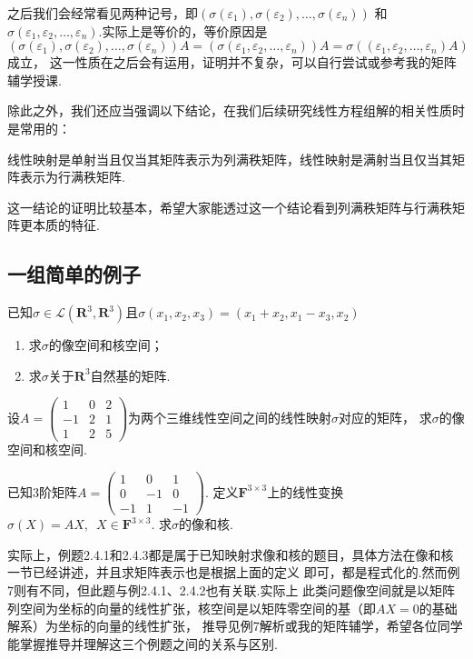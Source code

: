 之后我们会经常看见两种记号，即$(\sigma(\varepsilon_1),\sigma(\varepsilon_2),\ldots,\sigma(\varepsilon_n))$
和$\sigma(\varepsilon_1,\varepsilon_2,\ldots,\varepsilon_n)$.实际上是等价的，等价原因是
$(\sigma(\varepsilon_1),\sigma(\varepsilon_2),\ldots,\sigma(\varepsilon_n))A=(\sigma(\varepsilon_1,\varepsilon_2,\ldots,\varepsilon_n))A=\sigma((\varepsilon_1,\varepsilon_2,\ldots,\varepsilon_n)A)$成立，
这一性质在之后会有运用，证明并不复杂，可以自行尝试或参考我的矩阵辅学授课.

除此之外，我们还应当强调以下结论，在我们后续研究线性方程组解的相关性质时是常用的：
\begin{theorem}
    线性映射是单射当且仅当其矩阵表示为列满秩矩阵，线性映射是满射当且仅当其矩阵表示为行满秩矩阵.
\end{theorem}
这一结论的证明比较基本，希望大家能透过这一个结论看到列满秩矩阵与行满秩矩阵更本质的特征.
\subsection{一组简单的例子}
\begin{example}
    已知$\sigma \in \mathcal{L}(\mathbf{R}^3,\mathbf{R}^3)$且$\sigma(x_1,x_2,x_3)=(x_1+x_2,x_1-x_3, x_2)$
    \begin{enumerate}[label=(\arabic*)]
        \item 求$\sigma$的像空间和核空间；

        \item 求$\sigma$关于$\mathbf{R}^3$自然基的矩阵.
    \end{enumerate}
\end{example}

\begin{example}
    设$A=\begin{pmatrix}1 & 0 & 2 \\ -1 & 2 & 1 \\ 1 & 2 & 5\end{pmatrix}$为两个三维线性空间之间的线性映射$\sigma$对应的矩阵，
    求$\sigma$的像空间和核空间.
\end{example}

\begin{example}
    已知$3$阶矩阵$A=\begin{pmatrix}
        1 & 0 & 1 \\ 0 & -1 & 0 \\ -1 & 1 & -1
    \end{pmatrix}$. 定义$\mathbf{F}^{3 \times 3}$上的线性变换$\sigma(X)=AX,\enspace X \in \mathbf{F}^{3 \times 3}$.
    求$\sigma$的像和核.
\end{example}
实际上，例题2.4.1和2.4.3都是属于已知映射求像和核的题目，具体方法在像和核一节已经讲述，并且求矩阵表示也是根据上面的定义
即可，都是程式化的.然而例7则有不同，但此题与例2.4.1、2.4.2也有关联.实际上
此类问题像空间就是以矩阵列空间为坐标的向量的线性扩张，核空间是以矩阵零空间的基（即$AX=0$的基础解系）为坐标的向量的线性扩张，
推导见例7解析或我的矩阵辅学，希望各位同学能掌握推导并理解这三个例题之间的关系与区别. %

